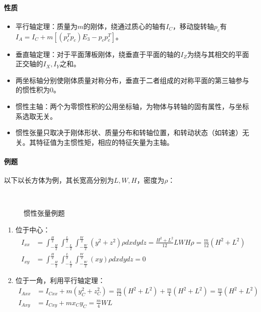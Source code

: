 \documentclass[
12pt, %
a4paper, 
oneside, %
headinclude,footinclude, %
]{scrartcl}
\begin{document}
\paragraph{性质}
\begin{itemize}
\item 平行轴定理：质量为$ m $的刚体，绕通过质心的轴有$ I_C $，移动旋转轴$ p_c $有\\$ I_A = I_C + m[(p_c^T p_c)E_3 - p_c p_c^T] $。
\item 垂直轴定理：对于平面薄板刚体，绕垂直于平面的轴的$ I_Z $为绕与其相交的平面正交轴的$ I_X, I_Y $之和。
\item 两坐标轴分别使刚体质量对称分布，垂直于二者组成的对称平面的第三轴参与的惯性积为$ 0 $。
\item 惯性主轴：两个为零惯性积的公用坐标轴，为物体与转轴的固有属性，与坐标系选取无关。
\item 惯性张量只取决于刚体形状、质量分布和转轴位置，和转动状态（如转速）无关。其特征值为主惯性矩，相应的特征矢量为主轴。
\end{itemize}
\paragraph{例题}
{\footnotesize
以下以长方体为例，其长宽高分别为$ L, W, H $，密度为$ \rho $： \\
\begin{minipage}{0.25\textwidth}
\begin{figure}[H]
\centering
\subfloat[位于中心]{\texttt{[image: 6.1]}} \\
\subfloat[位于一角]{\texttt{[image: 6.2]}}
\caption{惯性张量例题}
\end{figure}
\end{minipage}
\begin{minipage}{0.75\textwidth}
\begin{enumerate}
\item 位于中心：
\begin{align*}
I_{xx} &= \int_{-\frac{H}{2}}^{\frac{H}{2}} \int_{-\frac{L}{2}}^{\frac{L}{2}} \int_{-\frac{W}{2}}^{\frac{W}{2}} (y^2 + z^2)\rho dxdydz = \frac{H^2 + L^2}{12} LWH\rho = \frac{m}{12}(H^2 + L^2) \\
I_{xy} &= \int_{-\frac{H}{2}}^{\frac{H}{2}} \int_{-\frac{L}{2}}^{\frac{L}{2}} \int_{-\frac{W}{2}}^{\frac{W}{2}} (xy)\rho dxdydz = 0
\end{align*}
\item 位于一角，利用平行轴定理：
\begin{align*}
I_{Axx} &= I_{Cxx} + m(y_C^2 + z_C^2) = \frac{m}{12}(H^2 + L^2) + \frac{m}{4}(H^2 + L^2) = \frac{m}{3}(H^2 + L^2) \\
I_{Axy} &= I_{Cxy} + m x_C y_C = \frac{m}{4}WL
\end{align*}
\end{enumerate}
\end{minipage}
}
\end{document}
